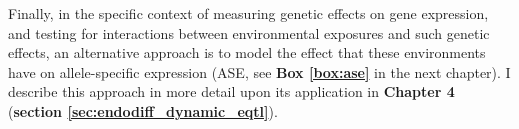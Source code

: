 Finally, in the specific context of measuring genetic effects on gene expression, and testing for interactions between environmental exposures and such genetic effects, an alternative approach is to model the effect that these environments have on allele-specific expression (ASE, see \textbf{Box \ref{box:ase}} in the next chapter).
I describe this approach in more detail upon its application in \textbf{Chapter 4} (\textbf{section \ref{sec:endodiff_dynamic_eqtl}}).







